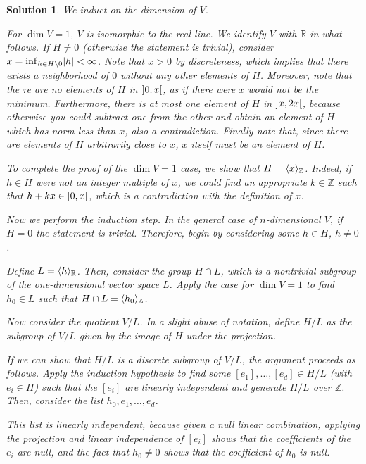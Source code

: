 \documentclass{article}
\theoremstyle{nonumberplain}
\newtheorem{sol}{Solution}
\newcommand{\R}{\mathbb{R}}
\newcommand{\Z}{\mathbb{Z}}
\DeclarePairedDelimiter{\norm}{\lvert}{\rvert}
\DeclarePairedDelimiter{\braket}{\langle}{\rangle}
\begin{document}
\begin{sol}
We induct on the dimension of $V$.

For $\dim V = 1$, $V$ is isomorphic to the real line. We identify $V$ with $\R$ in what follows. If $H \neq 0$ (otherwise the statement is trivial), consider $x = \inf_{h \in H \setminus 0} \norm h < \infty$. Note that $x > 0$ by discreteness, which implies that there exists a neighborhood of $0$ without any other elements of $H$. Moreover, note that the
re are no elements of $H$ in $\ointerval 0 x$, as if there were $x$ would not be the minimum. Furthermore, there is at most one element of $H$ in $\ointerval x {2x}$, because otherwise you could subtract one from the other and obtain an element of $H$ which has norm less than $x$, also a contradiction. Finally note that, since there are elements of $H$ arbitrarily close to $x$, $x$ itself must be an element of $H$.

To complete the proof of the $\dim V = 1$ case, we show that $H = \braket{x}_\Z$. Indeed, if $h \in H$ were not an integer multiple of $x$, we could find an appropriate $k \in \Z$ such that $h + k x \in \ointerval 0 x$, which is a contradiction with the definition of $x$.

\smallskip

Now we perform the induction step. In the general case of $n$-dimensional $V$, if $H = 0$ the statement is trivial. Therefore, begin by considering some $h \in H$, $h \neq 0$.

Define $L = \braket{h}_\R$. Then, consider the group $H \cap L$, which is a nontrivial subgroup of the one-dimensional vector space $L$. Apply the case for $\dim V = 1$ to find $h_0 \in L$ such that $H \cap L = \braket{h_0}_\Z$.

Now consider the quotient $V/L$. In a slight abuse of notation, define $H/L$ as the subgroup of $V/L$ given by the image of $H$ under the projection.

If we can show that $H/L$ is a discrete subgroup of $V/L$, the argument proceeds as follows. Apply the induction hypothesis to find some $[e_1], \dots, [e_d] \in H/L$ (with $e_i \in H$) such that the $[e_i]$ are linearly independent and generate $H/L$ over $\Z$. Then, consider the list $h_0, e_1, \dots, e_d$.

This list is linearly independent, because given a null linear combination, applying the projection and linear independence of $[e_i]$ shows that the coefficients of the $e_i$ are null, and the fact that $h_0 \neq 0$ shows that the coefficient of $h_0$ is null.


\end{sol}
\end{document}
